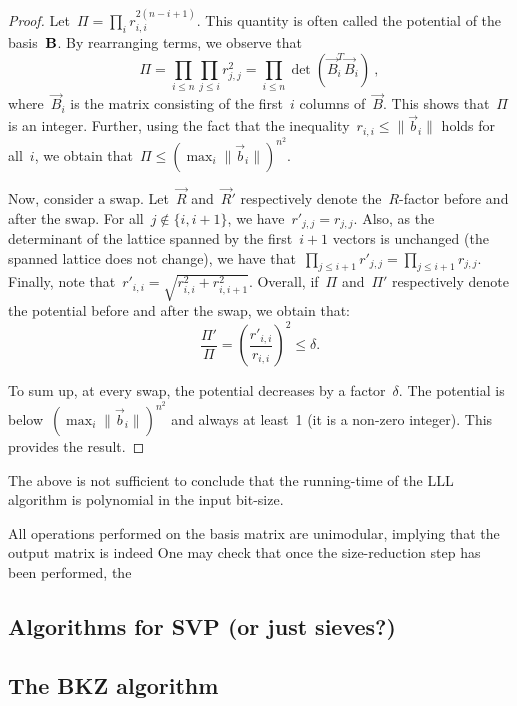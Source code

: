 \begin{proof}
Let~$\Pi = \prod_i r_{i,i}^{2(n-i+1)}$. This quantity is often called the potential of the basis~$\bf{B}$. 
By rearranging terms, we observe that
\[
\Pi = \prod_{i\leq n} \prod_{j \leq i} r_{j,j}^2 =  \prod_{i\leq n} \det (\vec{B}_i^T \vec{B}_i) \ ,
\]
where~$\vec{B}_i$ is the matrix consisting of the first~$i$ columns of~$\vec{B}$. This shows that~$\Pi$ is an integer. 
Further, using the fact that the inequality~$r_{i,i} \leq \|\vec{b}_i\|$ holds for all~$i$, we obtain 
that~$\Pi \leq (\max_i \|\vec{b}_i\|)^{n^2}$. 

Now, consider a swap. Let~$\vec{R}$ and~$\vec{R}'$ respectively denote the~$R$-factor before and after the swap. 
For all~$j \notin \{i,i+1\}$, we have~$r'_{j,j} = r_{j,j}$. Also, as the determinant of the lattice spanned by the first~$i+1$ vectors is unchanged (the spanned lattice does not change), we have that~$\prod_{j \leq i+1} r'_{j,j} =  \prod_{j \leq i+1} r_{j,j}$. 
Finally, note that~$r'_{i,i} = \sqrt{r_{i,i}^2 + r_{i,i+1}^2}$. 
Overall, 
if~$\Pi$ and~$\Pi'$ respectively denote the potential before and after the swap, we obtain that:
\[ 
\frac{\Pi'}{\Pi} = \left( \frac{r'_{i,i}}{r_{i,i}}\right)^2  \leq \delta.  
\]

To sum up, at every swap, the potential decreases by a factor~$\delta$. The potential is below~$(\max_i \|\vec{b}_i\|)^{n^2}$ and always at least~1 (it is a non-zero integer). This provides the result. 
\end{proof}

The above is not sufficient to conclude that the running-time of the LLL algorithm is polynomial in the input bit-size. 
 

All operations performed on the basis matrix are unimodular, implying that the output matrix is indeed 
One may check that once the size-reduction step has been performed, the 



\subsection{Algorithms for SVP (or just sieves?)} 

\subsection{The BKZ algorithm} 
